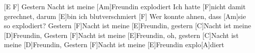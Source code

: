 \begin{guitar}
	\begin{highlightbar}
		[E F] Gestern Nacht ist meine [Am]Freundin explodiert
		Ich hatte [F]nicht damit gerechnet, darum [E]bin ich blutverschmiert
		[F] Wer konnte ahnen, dass [Am]sie so explodiert?
		Gestern [F]Nacht ist meine [E]Freundin, gestern [C]Nacht ist meine [D]Freundin, 
		Gestern [F]Nacht ist meine [E]Freundin, oh, gestern [C]Nacht ist meine [D]Freundin,
		Gestern [F]Nacht ist meine [E]Freundin explo[A]diert
	\end{highlightbar}
\end{guitar}